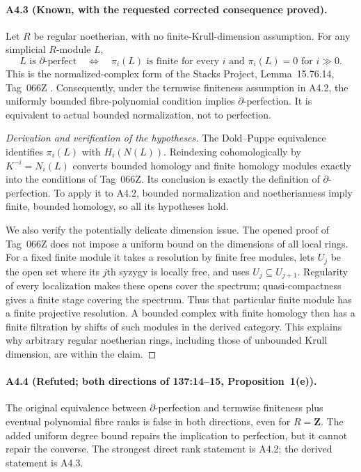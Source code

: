 \paragraph{A4.3 (Known, with the requested corrected consequence proved).}
\label{A4.3}
Let $R$ be regular noetherian, with no finite-Krull-dimension
assumption.  For any simplicial $R$-module $L$,
\[
 L\text{ is }\partial\text{-perfect}
 \quad\Longleftrightarrow\quad
 \pi_i(L)\text{ is finite for every }i
 \text{ and }\pi_i(L)=0\text{ for }i\gg0.
 \tag{A4.3a}
\]
This is the normalized-complex form of the Stacks Project,
Lemma~15.76.14, Tag~066Z \cite{Stacks066Z}.  Consequently, under
the termwise finiteness assumption in A4.2, the uniformly bounded
fibre-polynomial condition implies $\partial$-perfection.  It is
equivalent to actual bounded normalization, not to perfection.

\begin{proof}[Derivation and verification of the hypotheses]
The Dold--Puppe equivalence identifies $\pi_i(L)$ with
$H_i(N(L))$.  Reindexing cohomologically by
$K^{-i}=N_i(L)$ converts bounded homology and finite homology
modules exactly into the conditions of Tag~066Z.  Its conclusion
is exactly the definition of $\partial$-perfection.  To apply it
to A4.2, bounded normalization and noetherianness imply finite,
bounded homology, so all its hypotheses hold.

We also verify the potentially delicate dimension issue.  The
opened proof of Tag~066Z does not impose a uniform bound on the
dimensions of all local rings.  For a fixed finite module it
takes a resolution by finite free modules, lets $U_j$ be the open
set where its $j$th syzygy is locally free, and uses
$U_j\subseteq U_{j+1}$.  Regularity of every localization makes
these opens cover the spectrum; quasi-compactness gives a finite
stage covering the spectrum.  Thus that particular finite module
has a finite projective resolution.  A bounded complex with
finite homology then has a finite filtration by shifts of such
modules in the derived category.  This explains why arbitrary
regular noetherian rings, including those of unbounded Krull
dimension, are within the claim.
\end{proof}

\paragraph{A4.4 (Refuted; both directions of 137:14--15, Proposition~1(e)).}
\label{A4.4}
The original equivalence between $\partial$-perfection and
termwise finiteness plus eventual polynomial fibre ranks is false
in both directions, even for $R=\mathbf Z$.  The added uniform
degree bound repairs the implication to perfection, but it cannot
repair the converse.  The strongest direct rank statement is A4.2;
the derived statement is A4.3.

